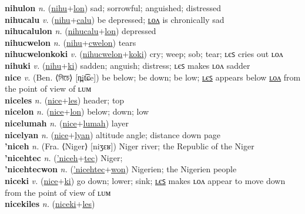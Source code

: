 \textbf{nihulon} \textit{n.} (\hyperref[nihu]{nihu}+\hyperref[lon]{lon})
sad; sorrowful; anguished; distressed \label{nihulon} \\
\textbf{nihucalu} \textit{v.} (\hyperref[nihu]{nihu}+\hyperref[calu]{calu})
be depressed; \hyperref[nihucalulon]{ʟᴏᴧ} is chronically sad \label{nihucalu} \\
\textbf{nihucalulon} \textit{n.} (\hyperref[nihucalu]{nihucalu}+\hyperref[lon]{lon})
depressed \label{nihucalulon} \\
\textbf{nihucwelon} \textit{n.} (\hyperref[nihu]{nihu}+\hyperref[cwelon]{cwelon})
tears \label{nihucwelon} \\
\textbf{nihucwelonkoki} \textit{v.} (\hyperref[nihucwelon]{nihucwelon}+\hyperref[koki]{koki})
cry; weep; sob; tear; ʟєꜱ cries out ʟᴏᴧ \label{nihucwelonkoki} \\
\textbf{nihuki} \textit{v.} (\hyperref[nihu]{nihu}+\hyperref[ki]{ki})
sadden; anguish; distress; ʟєꜱ makes ʟᴏᴧ sadder \label{nihuki} \\
\textbf{nice} \textit{v.} (Ben. ⟨নিচে⟩ [n̪it͡ɕe])
be below; be down; be low; \hyperref[niceles]{ʟєꜱ} appears below \hyperref[nicelon]{ʟᴏᴧ} from the point of view of ʟᴜᴍ \label{nice} \\
\textbf{niceles} \textit{n.} (\hyperref[nice]{nice}+\hyperref[les]{les})
header; top \label{niceles} \\
\textbf{nicelon} \textit{n.} (\hyperref[nice]{nice}+\hyperref[lon]{lon})
below; down; low \label{nicelon} \\
\textbf{nicelumah} \textit{n.} (\hyperref[nice]{nice}+\hyperref[lumah]{lumah})
layer \label{nicelumah} \\
\textbf{nicelyan} \textit{n.} (\hyperref[nice]{nice}+\hyperref[lyan]{lyan})
altitude angle; distance down page \label{nicelyan} \\
\textbf{'niceh} \textit{n.} (Fra. ⟨Niger⟩ [niʒɛʁ])
Niger river; the Republic of the Niger \label{'niceh} \\
\textbf{'nicehtec} \textit{n.} (\hyperref['niceh]{'niceh}+\hyperref[tec]{tec})
Niger; \label{'nicehtec} \\
\textbf{'nicehtecwon} \textit{n.} (\hyperref['nicehtec]{'nicehtec}+\hyperref[won]{won})
Nigerien; the Nigerien people \label{'nicehtecwon} \\
\textbf{niceki} \textit{v.} (\hyperref[nice]{nice}+\hyperref[ki]{ki})
go down; lower; sink; \hyperref[nicekiles]{ʟєꜱ} makes ʟᴏᴧ appear to move down from the point of view of ʟᴜᴍ \label{niceki} \\
\textbf{nicekiles} \textit{n.} (\hyperref[niceki]{niceki}+\hyperref[les]{les})
